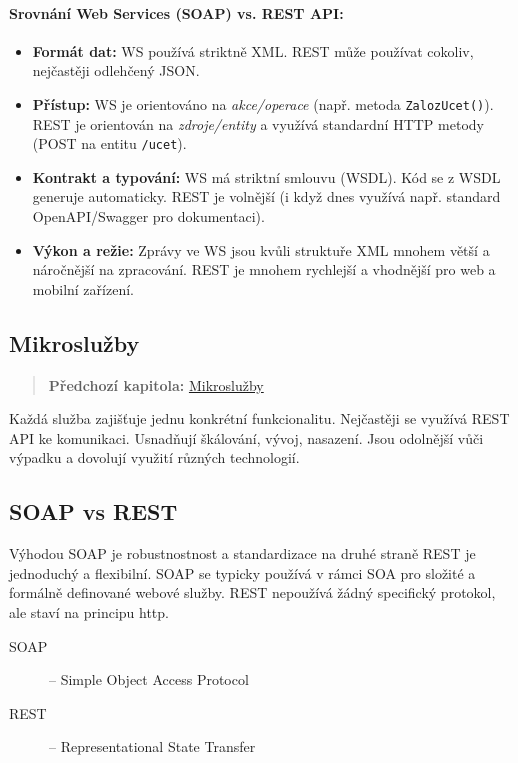 \paragraph*{Srovnání Web Services (SOAP) vs. REST API:}
\begin{itemize}
    \item \textbf{Formát dat:} WS používá striktně XML. REST může používat cokoliv, nejčastěji odlehčený JSON.
    \item \textbf{Přístup:} WS je orientováno na \textit{akce/operace} (např. metoda \texttt{ZalozUcet()}). REST je orientován na \textit{zdroje/entity} a využívá standardní HTTP metody (POST na entitu \texttt{/ucet}).
    \item \textbf{Kontrakt a typování:} WS má striktní smlouvu (WSDL). Kód se z WSDL generuje automaticky. REST je volnější (i když dnes využívá např. standard OpenAPI/Swagger pro dokumentaci).
    \item \textbf{Výkon a režie:} Zprávy ve WS jsou kvůli struktuře XML mnohem větší a náročnější na zpracování. REST je mnohem rychlejší a vhodnější pro web a mobilní zařízení.
\end{itemize}

\subsection{Mikroslužby}
\label{sub:mikrosluzby2}
\begin{quote}
    \textbf{Předchozí kapitola:} \hyperref[sub:mikrosluzby]{Mikroslužby}
\end{quote}
Každá služba zajišťuje jednu konkrétní funkcionalitu. Nejčastěji se využívá REST API ke komunikaci.
Usnadňují škálování, vývoj, nasazení. Jsou odolnější vůči výpadku a dovolují využití různých
technologií.

\subsection{SOAP vs REST}
Výhodou SOAP je robustnostnost a standardizace na druhé straně REST je jednoduchý a flexibilní.
SOAP se typicky používá v rámci SOA pro složité a formálně definované webové služby.
REST nepoužívá žádný specifický protokol, ale staví na principu http.

\begin{description}
    \item[SOAP] -- Simple Object Access Protocol
    \item[REST] -- Representational State Transfer
\end{description}

